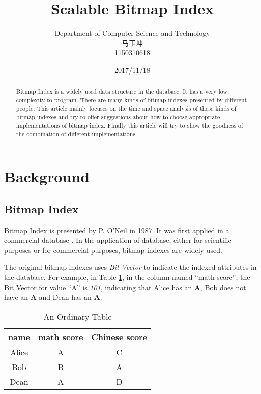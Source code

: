 \documentclass[12pt, a4paper]{article}
\begin{document}
\title{{\bf\Huge Scalable Bitmap Index}}
\author{Department of Computer Science and Technology\\马玉坤\\1150310618}
\date{2017/11/18}
\maketitle
\thispagestyle{empty}
\newpage

\begin{abstract}
  Bitmap Index is a widely used data structure in the database. It has a very low complexity to program. There are many kinds of bitmap indexes presented by different people. This article mainly focuses on the time and space analysis of these kinds of bitmap indexes and try to offer suggestions about how to choose appropriate implementations of bitmap index. Finally this article will try to show the goodness of the combination of different implementations.
\end{abstract}

\section{Background}

\subsection{Bitmap Index}

Bitmap Index is presented by P. O'Neil in 1987. It was first applied in a commercial database \citep{spiegler1985storage}. In the application of database, either for scientific purposes or for commercial purposes, bitmap indexes are widely used.

The original bitmap indexes uses {\emph{Bit Vector}} to indicate the indexed attributes in the database. For example, in Table \ref{table:ordinary-table}, in the column named ``math score'', the Bit Vector for value ``A'' is {\emph{101}}, indicating that Alice has an \textbf{A}, Bob does not have an \textbf{A} and Dean has an \textbf{A}.

\begin{table}[H]
\centering
\caption{An Ordinary Table}
\label{table:ordinary-table}
\begin{tabular}{ccc}
\toprule
name  & math score & Chinese score \\
\midrule
Alice & A          & C             \\
Bob   & B          & A             \\
Dean  & A          & D             \\
\bottomrule
\end{tabular}
\end{table}
\end{document}
